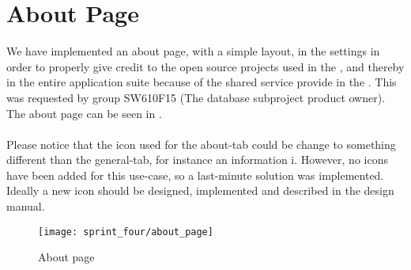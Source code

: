
\section{About Page}
\label{sec:about_page}

We have implemented an about page, with a simple layout, in the \launcher settings in order to properly give credit to the open source projects used in the \launcher, and thereby in the entire \giraf application suite because of the shared service provide in the \launcher. This was requested by group SW610F15 (The database subproject product owner). The about page can be seen in .
\\\\
Please notice that the icon used for the about-tab could be change to something different than the general-tab, for instance an information i. However, no icons have been added for this use-case, so a last-minute solution was implemented. Ideally a new icon should be designed, implemented and described in the design manual.

\begin{figure}[!htbp]
	\centering
	\texttt{[image: sprint\_four/about\_page]}
	\caption{About page}
	\label{fig:about_page}
\end{figure}
